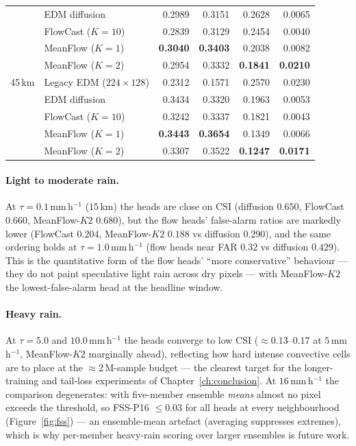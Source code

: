 \begin{table}[htbp]
\begin{tabular}{llrrrr}
           & EDM diffusion        & 0.2989 & 0.3151 & 0.2628 & 0.0065 \\
           & FlowCast ($K{=}10$)  & 0.2839 & 0.3129 & 0.2454 & 0.0040 \\
           & MeanFlow ($K{=}1$)   & \textbf{0.3040} & \textbf{0.3403} & 0.2038 & 0.0082 \\
           & MeanFlow ($K{=}2$)   & 0.2954 & 0.3332 & \textbf{0.1841} & \textbf{0.0210} \\
    \midrule
    45\,km & Legacy EDM ($224{\times}128$) & 0.2312 & 0.1571 & 0.2570 & 0.0230 \\
           & EDM diffusion        & 0.3434 & 0.3320 & 0.1963 & 0.0053 \\
           & FlowCast ($K{=}10$)  & 0.3242 & 0.3337 & 0.1821 & 0.0043 \\
           & MeanFlow ($K{=}1$)   & \textbf{0.3443} & \textbf{0.3654} & 0.1349 & 0.0066 \\
           & MeanFlow ($K{=}2$)   & 0.3307 & 0.3522 & \textbf{0.1247} & \textbf{0.0171} \\
    \bottomrule
  \end{tabular}
\end{table}

\paragraph{Light to moderate rain.} At $\tau = 0.1$\,mm\,h$^{-1}$ ($15$\,km) the heads are close on CSI (diffusion $0.650$, FlowCast $0.660$, MeanFlow-$K2$ $0.680$), but the flow heads' false-alarm ratios are markedly lower (FlowCast $0.204$, MeanFlow-$K2$ $0.188$ vs diffusion $0.290$), and the same ordering holds at $\tau = 1.0$\,mm\,h$^{-1}$ (flow heads near FAR $0.32$ vs diffusion $0.429$). This is the quantitative form of the flow heads' ``more conservative'' behaviour --- they do not paint speculative light rain across dry pixels --- with MeanFlow-$K2$ the lowest-false-alarm head at the headline window.

\paragraph{Heavy rain.} At $\tau = 5.0$ and $10.0$\,mm\,h$^{-1}$ the heads converge to low CSI ($\approx 0.13$--$0.17$ at $5$\,mm\,h$^{-1}$, MeanFlow-$K2$ marginally ahead), reflecting how hard intense convective cells are to place at the $\approx 2\,\text{M}$-sample budget --- the clearest target for the longer-training and tail-loss experiments of Chapter~\ref{ch:conclusion}. At $16$\,mm\,h$^{-1}$ the comparison degenerates: with five-member ensemble \emph{means} almost no pixel exceeds the threshold, so FSS-P16 $\le 0.03$ for all heads at every neighbourhood (Figure~\ref{fig:fss}) --- an ensemble-mean artefact (averaging suppresses extremes), which is why per-member heavy-rain scoring over larger ensembles is future work.

